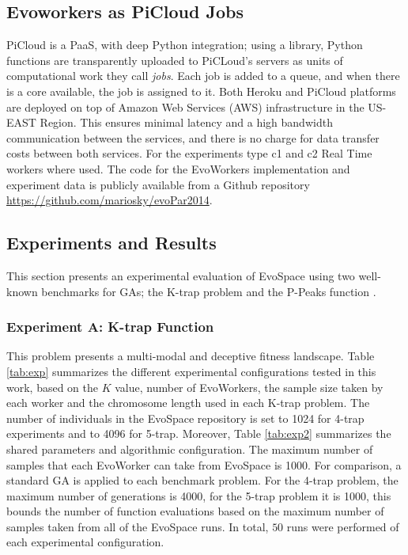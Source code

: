 \subsection{Evoworkers as PiCloud Jobs}
PiCloud is a PaaS, with deep Python integration; 
using a library, Python functions are transparently uploaded to PiCLoud's 
servers as units of computational work they call \emph{jobs}. 
Each job is added to a queue, and when there is a core available, 
the job is assigned to it. Both Heroku and PiCloud 
platforms are deployed on top of Amazon Web Services (AWS) 
infrastructure in the US-EAST Region. This ensures minimal 
latency and a high bandwidth communication between the services, 
and there is no charge for data transfer costs between both services.
For the experiments type c1 and c2 Real Time workers where used.  
The code for the EvoWorkers implementation and experiment data is publicly available from a Github repository \url{https://github.com/mariosky/evoPar2014}. 

\subsection{Experiments and Results}
This section presents an experimental evaluation of EvoSpace using two well-known benchmarks for GAs;
the K-trap problem \cite{trap} and the P-Peaks function \cite{Jong:PS97}.

\subsubsection{Experiment A: K-trap Function}
This problem presents a multi-modal and deceptive fitness landscape.
Table \ref{tab:exp} summarizes the different experimental configurations tested in this work, based on the $K$ value, number of EvoWorkers, the sample size taken by each worker and the chromosome length used in each K-trap problem. The number of individuals in the EvoSpace repository is set to 1024 for 4-trap experiments and to 4096 for 5-trap.
Moreover, Table \ref{tab:exp2} summarizes the shared parameters and algorithmic configuration.
The maximum number of samples that each EvoWorker can take from EvoSpace is 1000.
For comparison, a standard GA is applied to each benchmark problem.
For the 4-trap problem, the maximum number of generations is 4000, for the 5-trap problem it is 1000,
this bounds the number of function evaluations based on the maximum number of samples taken from all of the EvoSpace runs.
In total, $50$ runs were performed of each experimental configuration.


